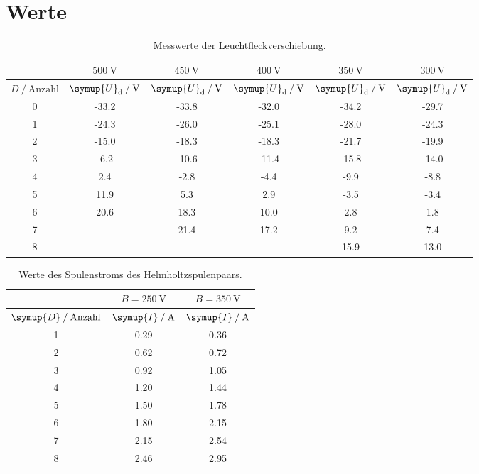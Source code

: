 \section{Werte}
\label{sec:werte}
\begin{table}
  \centering
  \caption{Messwerte der Leuchtfleckverschiebung.}
  \label{tab:leucht}
  \begin{tabular}{S[table-format=1.0] S[table-format=2.1]
                  S[table-format=2.1] S[table-format=2.1]
                  S[table-format=2.1] S[table-format=2.1]
    }
    \toprule
    & {$\SI{500}{\volt}$}
    & {$\SI{450}{\volt}$}
    & {$\SI{400}{\volt}$}
    & {$\SI{350}{\volt}$}
    & {$\SI{300}{\volt}$}\\
    \hline
    {$D \:/\: \text{Anzahl}$} & {$\symup{U}_\text{d} \:/\: \si{\volt}$}
    & {$\symup{U}_\text{d} \:/\: \si{\volt}$}
    & {$\symup{U}_\text{d} \:/\: \si{\volt}$}
    & {$\symup{U}_\text{d} \:/\: \si{\volt}$}
    & {$\symup{U}_\text{d} \:/\: \si{\volt}$}\\
     & -33.2 & -33.8 & -32.0 & -34.2 & -29.7 \\
    1 & -24.3 & -26.0 & -25.1 & -28.0 & -24.3 \\
    2 & -15.0 & -18.3 & -18.3 & -21.7 & -19.9 \\
    3 &  -6.2 & -10.6 & -11.4 & -15.8 & -14.0 \\
    4 &   2.4 &  -2.8 &  -4.4 &  -9.9 &  -8.8 \\
    5 &  11.9 &   5.3 &   2.9 &  -3.5 &  -3.4 \\
    6 &  20.6 &  18.3 &  10.0 &   2.8 &   1.8 \\
    7 &       &  21.4 &  17.2 &   9.2 &   7.4 \\
    8 &       &       &       &  15.9 &  13.0 \\
    \bottomrule
  \end{tabular}
\end{table}

\begin{table}
  \centering
  \caption{Werte des Spulenstroms des Helmholtzspulenpaars.}
  \label{tab:bwerte}
  \begin{tabular}{S[table-format=1.0]
                  S[table-format=1.2]
                  S[table-format=1.2]}
    \toprule
    & {$B = \SI{250}{\volt}$}
    & {$B = \SI{350}{\volt}$}\\
    \hline
    {$\symup{D} \:/\: \text{Anzahl}$}
    & {$\symup{I} \:/\: \si{\ampere}$}
    & {$\symup{I} \:/\: \si{\ampere}$}\\
     & 0.29 & 0.36 \\
    2 & 0.62 & 0.72 \\
    3 & 0.92 & 1.05 \\
    4 & 1.20 & 1.44 \\
    5 & 1.50 & 1.78 \\
    6 & 1.80 & 2.15 \\
    7 & 2.15 & 2.54 \\
    8 & 2.46 & 2.95 \\
    \bottomrule
  \end{tabular}
\end{table}

